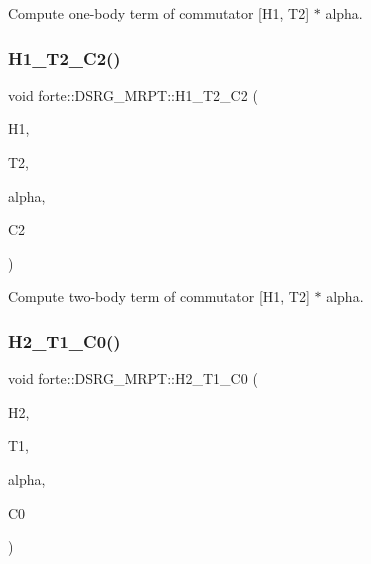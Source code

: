 Compute one-\/body term of commutator \mbox{[}H1, T2\mbox{]} $\ast$ alpha. 

\mbox{\label{classforte_1_1_d_s_r_g___m_r_p_t_a0d6154e51d2a19c2e21e11b0e96e8867}} 
\subsubsection{\texorpdfstring{H1\+\_\+\+T2\+\_\+\+C2()}{H1\_T2\_C2()}}
{\footnotesize\ttfamily void forte\+::\+D\+S\+R\+G\+\_\+\+M\+R\+P\+T\+::\+H1\+\_\+\+T2\+\_\+\+C2 (\begin{DoxyParamCaption}\item[{Blocked\+Tensor \&}]{H1,  }\item[{Blocked\+Tensor \&}]{T2,  }\item[{const double \&}]{alpha,  }\item[{Blocked\+Tensor \&}]{C2 }\end{DoxyParamCaption})\hspace{0.3cm}{\ttfamily [protected]}}



Compute two-\/body term of commutator \mbox{[}H1, T2\mbox{]} $\ast$ alpha. 

\mbox{\label{classforte_1_1_d_s_r_g___m_r_p_t_a0385770241da7d182d13c4e3ec51fcb2}} 
\subsubsection{\texorpdfstring{H2\+\_\+\+T1\+\_\+\+C0()}{H2\_T1\_C0()}}
{\footnotesize\ttfamily void forte\+::\+D\+S\+R\+G\+\_\+\+M\+R\+P\+T\+::\+H2\+\_\+\+T1\+\_\+\+C0 (\begin{DoxyParamCaption}\item[{Blocked\+Tensor \&}]{H2,  }\item[{Blocked\+Tensor \&}]{T1,  }\item[{const double \&}]{alpha,  }\item[{double \&}]{C0 }\end{DoxyParamCaption})\hspace{0.3cm}{\ttfamily [protected]}}



